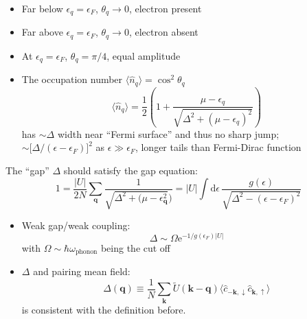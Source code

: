 \documentclass[11pt,letterpaper]{article}
\numberwithin{equation}{section} %
\renewcommand*{\vec}[1]{\bm{#1}}
\newcommand{\dif}{\mathrm d}
\newcommand\e{\mathrm{e}}
\newcommand{\spind}{\ensuremath{\downarrow}}
\newcommand{\spinu}{\ensuremath{\uparrow}}
\begin{document}
\begin{itemize}
  \item Far below $\epsilon_q = \epsilon_F$, $\theta_q\to 0$, electron present
  \item Far above $\epsilon_q = \epsilon_F$, $\theta_q\to 0$, electron absent
  \item At $\epsilon_q = \epsilon_F$, $\theta_q = \pi/4$, equal amplitude
  \item The occupation number $\langle \hat n_q\rangle = \cos^2\theta_q$
	  \begin{equation}
		  \langle\hat n_q\rangle = \frac 12 \left( 1 + \frac{\mu-\epsilon_q}
		  {\sqrt{\Delta^2+(\mu-\epsilon_q)^2}}\right)
	  \end{equation}
	  has $\sim\Delta$ width near ``Fermi surface'' and thus no sharp jump;
	  $\sim \big[\Delta/(\epsilon-\epsilon_F)\big]^2$ as $\epsilon \gg
	  \epsilon_F$, longer tails than Fermi-Dirac function
\end{itemize}

The ``gap'' $\Delta$ should satisfy the gap equation: 
\begin{equation}
  1 = \frac{|U|}{2N}\sum_{\vec q}\frac 1{\sqrt{\Delta^2 + (\mu-\epsilon_{\vec
  q}^2})} = |U|\int\dif\epsilon\,
	  \frac{g(\epsilon)}{\sqrt{\Delta^2-(\epsilon-\epsilon_F)^2}}
\end{equation}
\begin{itemize}
  \item Weak gap/weak coupling: 
	  \begin{equation}
		  \Delta \sim \Omega\e^{-1/g(\epsilon_F)|U|}
	  \end{equation}
	  with $\Omega \sim \hbar\omega_{\mbox{phonon}}$ being the cut off
  \item $\Delta$ and pairing mean field: 
	  \begin{equation}
		  \Delta(\vec q) \equiv \frac 1N \sum_{\vec k} \tilde U(\vec k-\vec
			  q)\langle \hat c_{-\vec k,\spind} \hat c_{\vec k, \spinu}\rangle
	  \end{equation}
	  is consistent with the definition before. 
\end{itemize}
\end{document}
